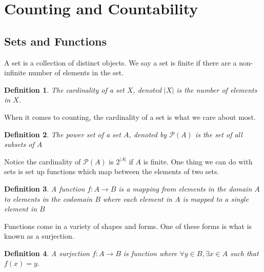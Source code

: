\documentclass{article}
\newtheorem{definition}{Definition}
\begin{document}
\section{Counting and Countability}
\subsection{Sets and Functions}
A set is a collection of distinct objects. We say a set is finite if there are a non-infinite
number of elements in the set. 
\begin{definition}
    The cardinality of a set $X$, denoted $|X|$ is the number of elements in $X$.
\end{definition}
When it comes to counting, the cardinality of a set is what we care about most.
\begin{definition}
    The power set of a set $A$, denoted by $\mathcal{P}(A)$ is the set of all subsets of $A$
\end{definition}
Notice the cardinality of $\mathcal{P}(A)$ is $2^{|A|}$ if $A$ is finite.
One thing we can do with sets is set up functions which map between the elements of two sets.
\begin{definition}
    A function $f:A\rightarrow B$ is a mapping from elements in the domain $A$ to elements in the codomain $B$ where each element in $A$ is mapped to
    a single element in $B$
\end{definition}
Functions come in a variety of shapes and forms. One of these forms is what is known as a surjection.
\begin{definition}
    A surjection $f:A\rightarrow B$ is function where $\forall y\in B, \exists x\in A$ such that $f(x)=y$.
\end{definition}
\begin{figure}[h]
    \centering
\end{figure}
\end{document}
